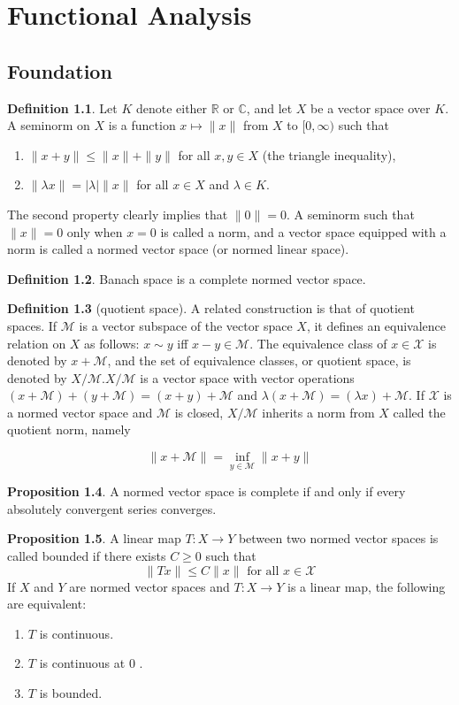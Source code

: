 \documentclass[12pt,a4paper]{book}
\newenvironment{enu}{\begin{enumerate}[(1)]}{\end{enumerate}}
\theoremstyle{definition}
\newtheorem{defn}{Definition}[section]
\newtheorem{prop}[defn]{Proposition}
\begin{document}
\chapter{Functional Analysis}
\section{Foundation}
\begin{defn}
    Let $K$ denote either $\mathbb{R}$ or $\mathbb{C}$, and let $X$ be a vector space over $K$. 
    A seminorm on $X$ is a function $x \mapsto\|x\|$ from $X$ to $[0, \infty)$ such that
\begin{enu}
\item  $\|x+y\| \leq\|x\|+\|y\|$ for all $x, y \in X$ (the triangle inequality),
\item $\|\lambda x\|=|\lambda|\|x\|$ for all $x \in X$ and $\lambda \in K$.
\end{enu}
    The second property clearly implies that $\|0\|=0$. A seminorm such that $\|x\|=0$ only when $x=0$ is called a norm, and a vector space equipped with a norm is called a normed vector space (or normed linear space).
\end{defn}
\begin{defn}
    Banach space is a complete normed vector space.
\end{defn}
\begin{defn}[quotient space]
    A related construction is that of quotient spaces. If $\mathcal{M}$ is a vector subspace of the vector space $X$, it defines an equivalence relation on $X$ as follows: $x \sim y$ iff $x-y \in \mathcal{M}$. The equivalence class of $x \in \mathcal{X}$ is denoted by $x+\mathcal{M}$, and the set of equivalence classes, or quotient space, is denoted by $X / \mathcal{M} . X / \mathcal{M}$ is a vector space with vector operations $(x+\mathcal{M})+(y+\mathcal{M})=(x+y)+\mathcal{M}$ and $\lambda(x+\mathcal{M})=(\lambda x)+\mathcal{M}$. If $\mathcal{X}$ is a normed vector space and $\mathcal{M}$ is closed, $X / \mathcal{M}$ inherits a norm from $X$ called the quotient norm, namely

    $$
    \|x+\mathcal{M}\|=\inf _{y \in \mathcal{M}}\|x+y\|
    $$    
\end{defn}
\begin{prop}
    A normed vector space is complete if and only if every  absolutely convergent series converges.
    \label{complete iff absolutely convergent}
\end{prop}
\begin{prop}
    A linear map $T: X \rightarrow Y$ between two normed vector spaces is called bounded if there exists $C \geq 0$ such that
    $$
    \|T x\| \leq C\|x\| \text { for all } x \in \mathcal{X}
    $$  
    If $X$ and $Y$ are normed vector spaces and $T: X \rightarrow Y$ is a linear map, the following are equivalent:
\begin{enu} 
    \item $T$ is continuous.
    \item $T$ is continuous at 0 .
    \item $T$ is bounded.
\end{enu}
\end{prop}
\end{document}
